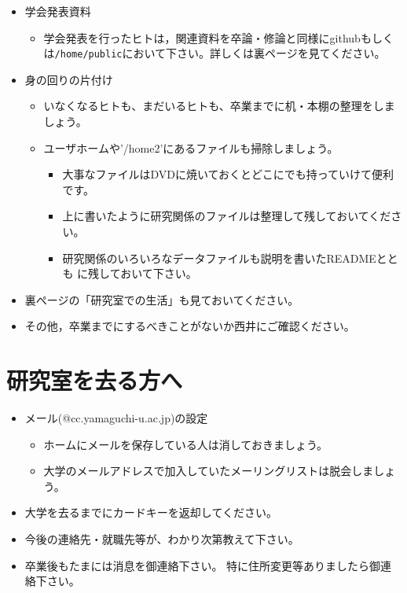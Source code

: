 \documentclass[11pt, ]{jsarticle}
\newcommand{\passthrough}[1]{#1}
\providecommand{\tightlist}{%
   \setlength{\itemsep}{0pt}\setlength{\parskip}{0pt}}
\begin{document}
\begin{itemize}
\tightlist
\item
  学会発表資料

  \begin{itemize}
  \tightlist
  \item
    学会発表を行ったヒトは，関連資料を卒論・修論と同様にgithubもしくは\passthrough{\lstinline!/home/public!}において下さい。詳しくは裏ページを見てください。
  \end{itemize}
\item
  身の回りの片付け

  \begin{itemize}
  \tightlist
  \item
    いなくなるヒトも、まだいるヒトも、卒業までに机・本棚の整理をしましょう。
  \item
    ユーザホームや'/home2'にあるファイルも掃除しましょう。

    \begin{itemize}
    \tightlist
    \item
      大事なファイルはDVDに焼いておくとどこにでも持っていけて便利です。
    \item
      上に書いたように研究関係のファイルは整理して残しておいてください。
    \item
      研究関係のいろいろなデータファイルも説明を書いたREADMEととも
      に残しておいて下さい。
    \end{itemize}
  \end{itemize}
\item
  裏ページの「研究室での生活」も見ておいてください。
\item
  その他，卒業までにするべきことがないか西井にご確認ください。
\end{itemize}

\hypertarget{ux7814ux7a76ux5ba4ux3092ux53bbux308bux65b9ux3078}{%
\section{研究室を去る方へ}\label{ux7814ux7a76ux5ba4ux3092ux53bbux308bux65b9ux3078}}

\begin{itemize}
\tightlist
\item
  メール(@cc.yamaguchi-u.ac.jp)の設定

  \begin{itemize}
  \tightlist
  \item
    ホームにメールを保存している人は消しておきましょう。
  \item
    大学のメールアドレスで加入していたメーリングリストは脱会しましょう。
  \end{itemize}
\item
  大学を去るまでにカードキーを返却してください。
\item
  今後の連絡先・就職先等が、わかり次第教えて下さい。
\item
  卒業後もたまには消息を御連絡下さい。
  特に住所変更等ありましたら御連絡下さい。
\end{itemize}
\end{document}
